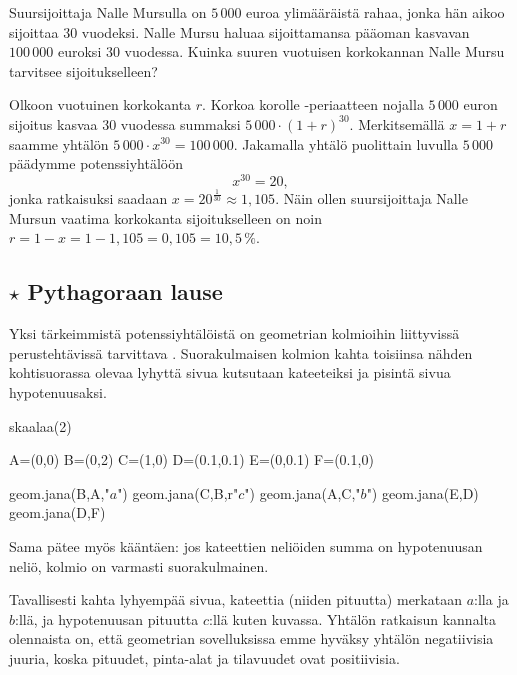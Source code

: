 \begin{esimerkki}
Suursijoittaja Nalle Mursulla on $5\,000$ euroa ylimääräistä rahaa, jonka hän aikoo sijoittaa $30$ vuodeksi.  Nalle Mursu haluaa sijoittamansa pääoman kasvavan $100\,000$ euroksi $30$ vuodessa.  Kuinka suuren vuotuisen korkokannan Nalle Mursu tarvitsee sijoitukselleen? 
	\begin{esimratk}
		Olkoon vuotuinen korkokanta $r$. Korkoa korolle -periaatteen nojalla $5\,000$ euron sijoitus kasvaa $30$ vuodessa summaksi $5\,000\cdot(1+r)^{30}$. Merkitsemällä $x=1+r$ saamme yhtälön $5\,000\cdot x^{30} = 100\,000$. Jakamalla yhtälö puolittain luvulla $5\,000$ päädymme potenssiyhtälöön
		\[ x^{30} = 20, \] 
		jonka ratkaisuksi saadaan $x=20^{\frac{1}{30}} \approx 1,105$. Näin ollen suursijoittaja Nalle Mursun vaatima korkokanta sijoitukselleen on noin $r=1-x=1-1,105=0,105=10,5\,\%$.
	\end{esimratk}
\end{esimerkki}

\subsection*{$\star$ Pythagoraan lause}

Yksi tärkeimmistä potenssiyhtälöistä on geometrian kolmioihin liittyvissä perustehtävissä tarvittava . Suorakulmaisen kolmion kahta toisiinsa nähden kohtisuorassa olevaa lyhyttä sivua kutsutaan kateeteiksi ja pisintä sivua hypotenuusaksi.


\begin{center}
\begin{kuva}
	skaalaa(2)

	A=(0,0)
	B=(0,2)
	C=(1,0)
	D=(0.1,0.1)
	E=(0,0.1)
	F=(0.1,0)

	geom.jana(B,A,"$a$")
	geom.jana(C,B,r"$c$")
	geom.jana(A,C,"$b$")
	geom.jana(E,D)
	geom.jana(D,F)
\end{kuva}
\end{center}

Sama pätee myös kääntäen: jos kateettien neliöiden summa on hypotenuusan neliö, kolmio on varmasti suorakulmainen.

Tavallisesti kahta lyhyempää sivua, kateettia (niiden pituutta) merkataan $a$:lla ja $b$:llä, ja hypotenuusan pituutta $c$:llä kuten kuvassa. Yhtälön ratkaisun kannalta olennaista on, että geometrian sovelluksissa emme hyväksy yhtälön negatiivisia juuria, koska pituudet, pinta-alat ja tilavuudet ovat positiivisia.


